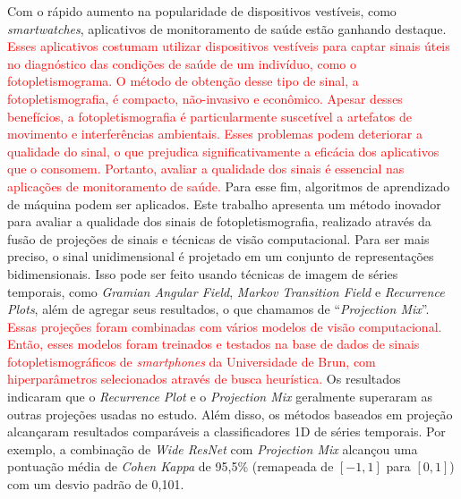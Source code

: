 Com o rápido aumento na popularidade de dispositivos vestíveis, como \textit{smartwatches}, aplicativos de monitoramento de saúde estão ganhando destaque. \textcolor{red}{Esses aplicativos costumam utilizar dispositivos vestíveis para captar sinais úteis no diagnóstico das condições de saúde de um indivíduo, como o fotopletismograma. O método de obtenção desse tipo de sinal, a fotopletismografia, é compacto, não-invasivo e econômico. Apesar desses benefícios, a fotopletismografia é particularmente suscetível a artefatos de movimento e interferências ambientais. Esses problemas podem deteriorar a qualidade do sinal, o que prejudica significativamente a eficácia dos aplicativos que o consomem. Portanto, avaliar a qualidade dos sinais é essencial nas aplicações de monitoramento de saúde.}
Para esse fim, algoritmos de aprendizado de máquina podem ser aplicados. Este trabalho apresenta um método inovador para avaliar a qualidade dos sinais de fotopletismografia, realizado através da fusão de projeções de sinais e técnicas de visão computacional. Para ser mais preciso, o sinal unidimensional é projetado em um conjunto de representações bidimensionais. Isso pode ser feito usando técnicas de imagem de séries temporais, como \textit{Gramian Angular Field}, \textit{Markov Transition Field} e \textit{Recurrence Plots}, além de agregar seus resultados, o que chamamos de ``\textit{Projection Mix}''. \textcolor{red}{Essas projeções foram combinadas com vários modelos de visão computacional. Então, esses modelos foram treinados e testados na base de dados de sinais fotopletismográficos de \textit{smartphones} da Universidade de Brun, com hiperparâmetros selecionados através de busca heurística.} Os resultados indicaram que o \textit{Recurrence Plot} e o \textit{Projection Mix} geralmente superaram as outras projeções usadas no estudo. Além disso, os métodos baseados em projeção alcançaram resultados comparáveis a classificadores 1D de séries temporais. Por exemplo, a combinação de \textit{Wide ResNet} com \textit{Projection Mix} alcançou uma pontuação média de \textit{Cohen Kappa} de 95,5\% (remapeada de $[-1,1]$ para $[0,1]$) com um desvio padrão de 0,101. 
